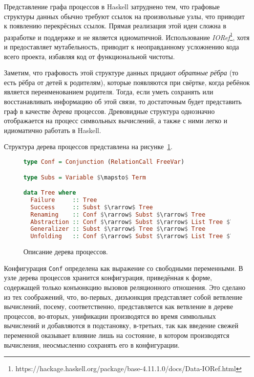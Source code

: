 
Представление графа процессов в Haskell затруднено тем, что графовые
структуры данных обычно требуют ссылок на произвольные узлы,
что приводит к появлению перекрёсных ссылок. Прямая реализация этой
идеи сложна в разработке и поддержке и не является идиоматичной.
Использование \emph{IORef}\footnote{https://hackage.haskell.org/package/base-4.11.1.0/docs/Data-IORef.html},
хотя и предоставляет мутабельность, приводит к неоправданному усложнению кода всего проекта,
избавляя код от функциональной чистоты.

Заметим, что графовость этой структуре данных придают \emph{обратные рёбра}
(то есть рёбра от детей к родителям), которые появляются при свёртке, когда ребёнок
является переименованием родителя.
Тогда, если уметь сохранять или восстанавливать информацию об этой связи, то
достаточным будет представить граф в качестве \emph{дерева} процессов.
Древовидные структура однозначно отображается на процесс символьных вычислений,
а также с ними легко и идиоматично работать в Haskell.

Структура дерева процессов представлена на рисунке~\ref{fig:ptree}.

\begin{figure}[h!]
\begin{lstlisting}[mathescape,language=Haskell,extendedchars=\true,frame=single,basicstyle=\ttfamily]
type Conf = Conjunction (RelationCall FreeVar)

type Subs = Variable $\mapsto$ Term

data Tree where
  Failure     :: Tree
  Success     :: Subst $\rarrow$ Tree
  Renaming    :: Conf $\rarrow$ Subst $\rarrow$ Tree
  Abstraction :: Conf $\rarrow$ Subst $\rarrow$ List Tree $\rarrow$ Tree
  Generalizer :: Subst $\rarrow$ Tree $\rarrow$ Tree
  Unfolding   :: Conf $\rarrow$ Subst $\rarrow$ List Tree $\rarrow$ Tree
\end{lstlisting}
\caption{Описание дерева процессов.}
\label{fig:ptree}
\end{figure}

Конфигурация \lstinline{Conf} определена как выражение со свободными переменными.
В узле дерева процессов хранится конфигурация, приведённая к форме, содержащей только конъюнкцию вызовов
реляционного отношения. Это сделано из тех соображений, что, во-первых, дизъюнкция представляет
собой ветвление вычислений, посему, соответственно, представляется как ветвление в дереве процессов,
во-вторых, унификации производятся во время символьных вычислений и добавляются в подстановку,
в-третьих, так как введение свежей переменной оказывает влияние лишь на состояние, в котором производятся вычисления,
неосмысленно сохранять его в конфигурации.

